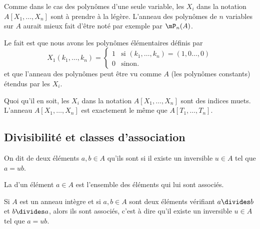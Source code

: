 \begin{normaltext}
	Comme dans le cas des polynômes d'une seule variable, les \( X_i\) dans la notation \( A[X_1,\ldots, X_n]\) sont à prendre à la légère. L'anneau des polynômes de \( n\) variables sur \( A\) aurait mieux fait d'être noté par exemple par \( \mP_n(A)\).

	Le fait est que nous avons les polynômes élémentaires définis par
	\begin{equation}
		X_1(k_1,\ldots, k_n)=\begin{cases}
			1 & \text{si } (k_1,\ldots, k_n)=(1,0\ldots, 0) \\
			0 & \text{sinon. }
		\end{cases}
	\end{equation}
	et que l'anneau des polynômes peut être vu comme \( A\) (les polynômes constants) étendus par les \( X_i\).

	Quoi qu'il en soit, les \( X_i\) dans la notation \( A[X_1,\ldots, X_n]\) sont des indices muets. L'anneau \( A[X_1,\ldots, X_n]\) est exactement le même que \( A[T_1,\ldots, T_n]\).
\end{normaltext}

\subsection{Divisibilité et classes d'association}
\label{DivisibiliteAnneauxIntegres}

\begin{definition}\label{DefrXUixs}
	On dit de deux éléments \( a,b\in A\) qu'ils sont  si il existe un inversible \( u\in A\) tel que \( a=ub\).

	La  d'un élément \( a \in A \) est l'ensemble des éléments qui lui sont associés.
\end{definition}

\begin{lemma}\label{LemRmVTRq}
	Si \( A\) est un anneau intègre et si \( a,b\in A\) sont deux éléments vérifiant \( a\divides b\) et \( b\divides a\), alors ils sont associés, c'est à dire qu'il existe un inversible \( u\in A\) tel que \( a=ub\).
\end{lemma}


